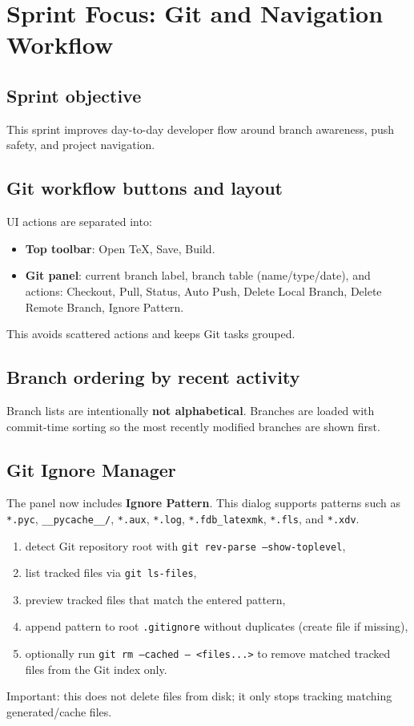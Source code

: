 \chapter{Sprint Focus: Git and Navigation Workflow}
\minitoc

\section{Sprint objective}
This sprint improves day-to-day developer flow around branch awareness, push safety, and project navigation.

\section{Git workflow buttons and layout}
UI actions are separated into:
\begin{itemize}
  \item \textbf{Top toolbar}: Open TeX, Save, Build.
  \item \textbf{Git panel}: current branch label, branch table (name/type/date), and actions: Checkout, Pull, Status, Auto Push, Delete Local Branch, Delete Remote Branch, Ignore Pattern.
\end{itemize}
This avoids scattered actions and keeps Git tasks grouped.

\section{Branch ordering by recent activity}
Branch lists are intentionally \textbf{not alphabetical}. Branches are loaded with commit-time sorting so the most recently modified branches are shown first.

\section{Git Ignore Manager}
The panel now includes \textbf{Ignore Pattern}. This dialog supports patterns such as \texttt{*.pyc}, \texttt{\_\_pycache\_\_/}, \texttt{*.aux}, \texttt{*.log}, \texttt{*.fdb\_latexmk}, \texttt{*.fls}, and \texttt{*.xdv}.
\begin{enumerate}
  \item detect Git repository root with \texttt{git rev-parse --show-toplevel},
  \item list tracked files via \texttt{git ls-files},
  \item preview tracked files that match the entered pattern,
  \item append pattern to root \texttt{.gitignore} without duplicates (create file if missing),
  \item optionally run \texttt{git rm --cached -- <files...>} to remove matched tracked files from the Git index only.
\end{enumerate}
Important: this does not delete files from disk; it only stops tracking matching generated/cache files.

